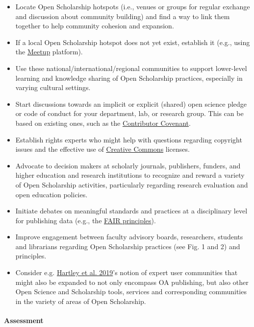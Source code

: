 \begin{itemize}
\item
  Locate Open Scholarship hotspots (i.e., venues or groups for regular
  exchange and discussion about community building) and find a way to
  link them together to help community cohesion and expansion.
\item
  If a local Open Scholarship hotspot does not yet exist, establish it
  (e.g., using the \href{https://www.meetup.com/}{Meetup} platform).
\item
  Use these national/international/regional communities to support
  lower-level learning and knowledge sharing of Open Scholarship
  practices, especially in varying cultural settings.
\item
  Start discussions towards an implicit or explicit (shared) open
  science pledge or code of conduct for your department, lab, or
  research group. This can be based on existing ones, such as the
  \href{https://www.contributor-covenant.org/de/version/1/4/code-of-conduct}{Contributor
  Covenant}.
\item
  Establish rights experts who might help with questions regarding
  copyright issues and the effective use of
  \href{https://creativecommons.org/}{Creative Commons} licenses.
\item
  Advocate to decision makers at scholarly journals, publishers,
  funders, and higher education and research institutions to recognize
  and reward a variety of Open Scholarship activities, particularly
  regarding research evaluation and open education policies.
\item
  Initiate debates on meaningful standards and practices at a
  disciplinary level for publishing data (e.g., the
  \href{https://www.go-fair.org/fair-principles/}{FAIR principles}).
\item
  Improve engagement between faculty advisory boards, researchers,
  students and librarians regarding Open Scholarship practices (see Fig.
  1 and 2) and principles.
\item
  Consider e.g. \href{https://doi.org/10.1002/leap.1228}{Hartley et al.
  2019}'s notion of expert user communities that might also be expanded
  to not only encompass OA publishing, but also other Open Science and
  Scholarship tools, services and corresponding communities in the
  variety of areas of Open Scholarship.
\end{itemize}

\paragraph{Assessment}\label{assessment-1}

